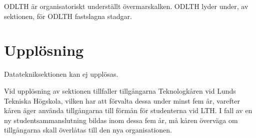 \documentclass[stadgar]{dsekprotokoll}
\begin{document}
\begin{stadgeavsnitt}


ODLTH är organisatoriskt underställt övermarskalken. ODLTH lyder under, av
sektionen, för ODLTH fastslagna stadgar.

\end{stadgeavsnitt}

\section{Upplösning}

\begin{stadgeavsnitt}


Datatekniksektionen kan ej upplösas.


Vid upplösning av sektionen tillfaller tillgångarna Teknologkåren vid Lunds
Tekniska Högskola, vilken har att förvalta dessa under minst fem år,
varefter kåren äger använda tillgångarna till förmån för studenterna vid
LTH. I fall av en ny studentsammanslutning bildas inom dessa fem år, må
kåren överväga om tillgångarna skall överlåtas till den nya organisationen.

\end{stadgeavsnitt}
\end{document}
